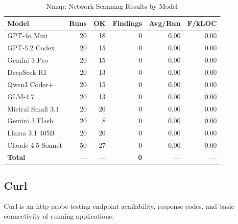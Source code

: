 \begin{table}[htbp]
    \centering
    \caption{Nmap: Network Scanning Results by Model}
    \label{tab:tool_nmap}
    \small
    \begin{tabular}{@{} l r r r r r @{}}
        \toprule
        \textbf{Model} & \textbf{Runs} & \textbf{OK} & \textbf{Findings} & \textbf{Avg/Run} & \textbf{F/kLOC} \\
        \midrule
        GPT-4o Mini & 20 & 18 & 0 & 0.00 & 0.00 \\
        GPT-5.2 Codex & 20 & 15 & 0 & 0.00 & 0.00 \\
        Gemini 3 Pro & 20 & 15 & 0 & 0.00 & 0.00 \\
        DeepSeek R1 & 20 & 13 & 0 & 0.00 & 0.00 \\
        Qwen3 Coder+ & 20 & 15 & 0 & 0.00 & 0.00 \\
        GLM-4.7 & 20 & 13 & 0 & 0.00 & 0.00 \\
        Mistral Small 3.1 & 20 & 20 & 0 & 0.00 & 0.00 \\
        Gemini 3 Flash & 20 & 8 & 0 & 0.00 & 0.00 \\
        Llama 3.1 405B & 20 & 20 & 0 & 0.00 & 0.00 \\
        Claude 4.5 Sonnet & 50 & 27 & 0 & 0.00 & 0.00 \\
        \midrule
        \textbf{Total} & --- & --- & \textbf{0} & --- & --- \\
        \bottomrule
    \end{tabular}
\end{table}

\subsection{Curl}

Curl is an http probe testing endpoint availability, response codes, and basic connectivity of running applications.

